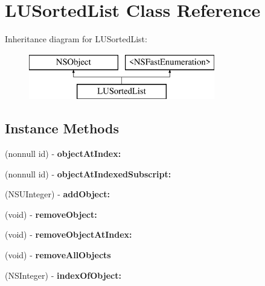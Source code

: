 \hypertarget{interface_l_u_sorted_list}{}\section{L\+U\+Sorted\+List Class Reference}
\label{interface_l_u_sorted_list}
Inheritance diagram for L\+U\+Sorted\+List\+:\begin{figure}[H]
\begin{center}
\leavevmode
\includegraphics[height=2.000000cm]{interface_l_u_sorted_list}
\end{center}
\end{figure}
\subsection*{Instance Methods}
\begin{DoxyCompactItemize}
\item 
\mbox{\label{interface_l_u_sorted_list_aec2dfe6fba41b30c54085a11fbadd60b}} 
(nonnull id) -\/ {\bfseries object\+At\+Index\+:}
\item 
\mbox{\label{interface_l_u_sorted_list_a62d9755e820b6eab86bbbf48a02cb82c}} 
(nonnull id) -\/ {\bfseries object\+At\+Indexed\+Subscript\+:}
\item 
\mbox{\label{interface_l_u_sorted_list_a7b340e4b96dabdbfa48fe443721e80de}} 
(N\+S\+U\+Integer) -\/ {\bfseries add\+Object\+:}
\item 
\mbox{\label{interface_l_u_sorted_list_a6f747b95eb4dd5f5608f1c38187d5389}} 
(void) -\/ {\bfseries remove\+Object\+:}
\item 
\mbox{\label{interface_l_u_sorted_list_a0bb1621632ee78d9bcd87a08ec5221f6}} 
(void) -\/ {\bfseries remove\+Object\+At\+Index\+:}
\item 
\mbox{\label{interface_l_u_sorted_list_a65d7c7e68893ff027ea33cb38bc0666f}} 
(void) -\/ {\bfseries remove\+All\+Objects}
\item 
\mbox{\label{interface_l_u_sorted_list_a870b4c0877d2f611f81111acdecef868}} 
(N\+S\+Integer) -\/ {\bfseries index\+Of\+Object\+:}
\end{DoxyCompactItemize}
